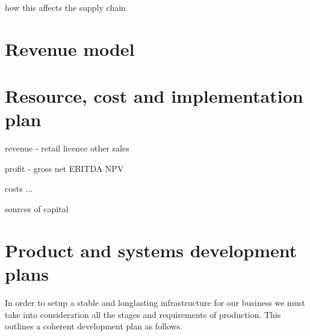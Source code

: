 \documentclass{article}
\begin{document}
how this affects the supply chain
\section{Revenue model}
\section{Resource, cost and implementation plan}
revenue
 - retail
   licence
   other sales

profit
 - gross
   net
   EBITDA
   NPV

costs
 ...

sources of capital
\section{Product and systems development plans}
In order to setup a stable and longlasting infrastructure for our business we must take into consideration all the stages and requirements of production. This outlines a coherent development plan as follows.
\end{document}

